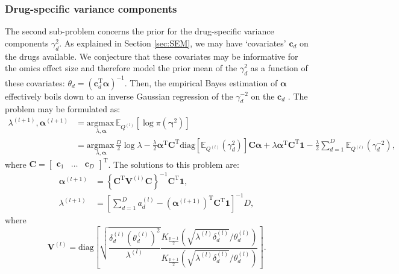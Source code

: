 \documentclass[a4paper,hidelinks]{article}\usepackage[]{graphicx}\usepackage[]{color}
\newcommand{\bgamma}{\bm{\gamma}}
\newcommand{\Vm}{\mathbf{V}}
\newcommand{\0}{\bm{0}}
\newcommand{\argmax}{\text{argmax} \,}
\newcommand{\E}{\mathbb{E}}
\newcommand{\tr}{^{\text{T}}}
\newcommand{\diag}{\text{diag}}
\renewcommand{\(}{\left(}
\renewcommand{\)}{\right)}
\renewcommand{\[}{\left[}
\renewcommand{\]}{\right]}
\begin{document}
	\subsubsection{Drug-specific variance components}
	The second sub-problem concerns the prior for the drug-specific variance components $\gamma_d^2$. As explained in Section \ref{sec:SEM}, we may have `covariates' $\mathbf{c}_d$ on the drugs available. We conjecture that these covariates may be informative for the omics effect size and therefore model the prior mean of the $\gamma_d^2$ as a function of these covariates: $\theta_d = (\mathbf{c}_d \tr \bm{\alpha})^{-1}$. Then, the empirical Bayes estimation of $\bm{\alpha}$ effectively boils down to an inverse Gaussian regression of the $\gamma_d^{-2}$ on the $\mathbf{c}_d$ \cite[]{fries_optimal_1986,whitmore_regression_1983}. The problem may be formulated as:
	\begin{align*}\label{eq:optproblem2}
	\lambda^{(l+1)}, \bm{\alpha}^{(l+1)} & = \underset{\lambda,\bm{\alpha}}{\argmax} \E_{Q^{(l)}} [\log \pi (\bgamma^2)] \\
	& = \underset{\lambda,\bm{\alpha}}{\argmax} \frac{D}{2} \log \lambda - \frac{\lambda}{2} \bm{\alpha} \tr \mathbf{C} \tr \diag [\E_{Q^{(l)}}(\gamma_d^2)] \mathbf{C} \bm{\alpha} + \lambda \bm{\alpha} \tr \mathbf{C} \tr \mathbf{1} - \frac{\lambda}{2} \sum_{d=1}^D \E_{Q^{(l)}}(\gamma_d^{-2}),
	\end{align*}
	where $\mathbf{C} = \begin{bmatrix} \mathbf{c}_1 & \dots & \mathbf{c}_D \end{bmatrix} \tr$. The solutions to this problem are:
	\begin{align*}
	\bm{\alpha}^{(l+1)} & = \left\{ \mathbf{C} \tr \Vm^{(l)} \mathbf{C} \right\}^{-1} \mathbf{C} \tr \mathbf{1}, \\
	\lambda^{(l+1)} & = \[ \sum_{d=1}^D a_d^{(l)} - (\bm{\alpha}^{(l+1)}) \tr \mathbf{C} \tr \mathbf{1} \]^{-1} D,
	\end{align*}
	where 
	$$
	\Vm^{(l)} = \diag \[ \sqrt{\frac{\delta_d^{(l)}(\theta_d^{(l)})^2}{\lambda^{(l)}}} \frac{K_{\frac{p - 1}{2}} \( \sqrt{\lambda^{(l)} \delta_d^{(l)}}/\theta^{(l)}_d \)}{K_{\frac{p + 1}{2}} \( \sqrt{\lambda^{(l)} \delta_d^{(l)}}/\theta^{(l)}_d \)} \].
	$$
	
\end{document}
